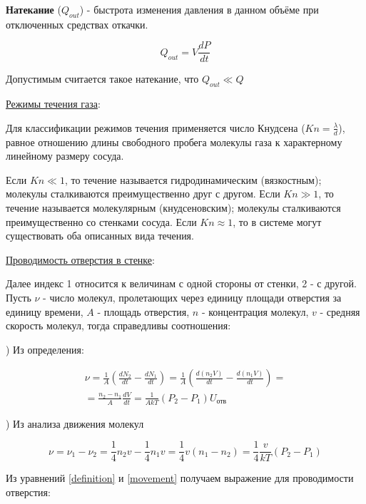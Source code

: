 \documentclass[15pt,a5paper,reqno]{article}
\begin{document}
    \textbf{Натекание} ($Q_{out}$) - быстрота изменения давления в данном объёме при отключенных средствах откачки.
    
    \begin{equation}\label{leak}
        Q_{out} = V\frac{dP}{dt}
    \end{equation}
    
    Допустимым считается такое натекание, что $Q_{out} \ll Q$
    
    \noindent\underline{Режимы течения газа}:
    
    Для классификации режимов течения применяется число Кнудсена ($Kn = \frac{\lambda}{d}$), равное отношению длины свободного пробега молекулы газа к характерному линейному размеру сосуда.
    
    Если $Kn \ll 1$, то течение называется гидродинамическим (вязкостным); молекулы сталкиваются преимущественно друг с другом. Если $Kn \gg 1$, то течение называется молекулярным (кнудсеновским); молекулы сталкиваются преимущественно со стенками сосуда. Если $Kn \approx
    1$, то в системе могут существовать оба описанных вида течения.
    
    \noindent\underline{Проводимость отверстия в стенке}:
    
    Далее индекс 1 относится к величинам с одной стороны от стенки, 2 - с другой.
    Пусть $\nu$ - число молекул, пролетающих через единицу площади отверстия за единицу времени, $A$ - площадь отверстия, $n$ - концентрация молекул, $v$ - средняя скорость молекул, тогда справедливы соотношения:
    
    ) Из определения:
     
    \begin{eqnarray}\label{definition}
        \nu = \frac{1}{A}\left(\frac{dN_2}{dt} - \frac{dN_1}{dt}\right) = \frac{1}{A}\left(\frac{d(n_2V)}{dt} - \frac{d(n_1V)}{dt}\right) = \nonumber\\
        = \frac{n_2 - n_1}{A}\frac{dV}{dt} = \frac{1}{AkT}(P_2 - P_1)U_{\text{отв}}
    \end{eqnarray}
    
    ) Из анализа движения молекул
    
    \begin{equation}\label{movement}
        \nu = \nu_1 - \nu_2 = \frac{1}{4}n_2v - \frac{1}{4}n_1v = \frac{1}{4}v(n_1 - n_2) = \frac{1}{4}\frac{v}{kT}(P_2 - P_1)
    \end{equation}
    
    Из уравнений \eqref{definition} и \eqref{movement} получаем выражение для проводимости отверстия:
    
\end{document}

